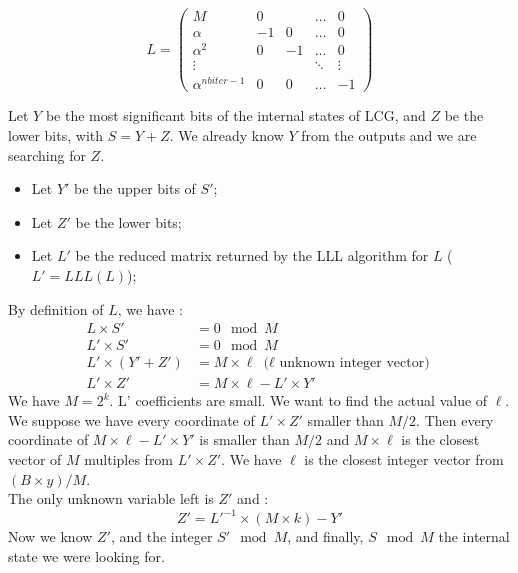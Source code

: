 \documentclass[preprint]{iacrtrans}
\begin{document}
\begin{equation}
L=
\begin{pmatrix} 
M & 0 & & \dots & 0\\
\alpha & -1 & 0 & \dots & 0\\
\alpha ^2 & 0 & -1 & \dots & 0\\
\vdots & & & \ddots & \vdots\\
\alpha ^{nbiter - 1} & 0 & 0 & \dots & -1
\end{pmatrix}
\end{equation}


Let $Y$ be the most significant bits of the internal states of LCG, and $Z$ be the lower bits, with $S = Y + Z$. We already know $Y$ from the outputs and we are searching for $Z$. 
\begin{itemize}
    \item Let $Y'$ be the upper bits of $S'$;
    \item Let $Z'$ be the lower bits;
    \item Let $L'$  be the reduced matrix returned by the LLL algorithm for $L$ ($L' = LLL(L)$);
\end{itemize}

By definition of $L$, we have :
\begin{align}
    L \times S' &=0 \mod{M}\\
    L' \times S' &= 0 \mod{M}\\
    L' \times (Y' + Z') &= M \times \ell\ \text{($\ell$ unknown integer vector)}\\
    L' \times Z' &= M \times \ell - L' \times Y'
\end{align}
We have $M = 2^k$. L' coefficients are small. We want to find the actual value of $\ell$.\\

We suppose we have every coordinate of $L' \times Z'$ smaller than $M/2$. Then every coordinate of $M \times \ell - L' \times Y'$ is smaller than $M/2$ and $M \times \ell$ is the closest vector of $M$ multiples from $L' \times Z'$. We have $\ell$ is the closest integer vector from $(B \times y)/M$.\\

The only unknown variable left is $Z'$ and :
\begin{equation}
    Z' = L'^{-1} \times (M \times k) - Y' 
\end{equation}
Now we know $Z'$, and the integer $S' \mod{M}$, and finally, $S \mod{M}$ the internal state we were looking for.\\
\end{document}

